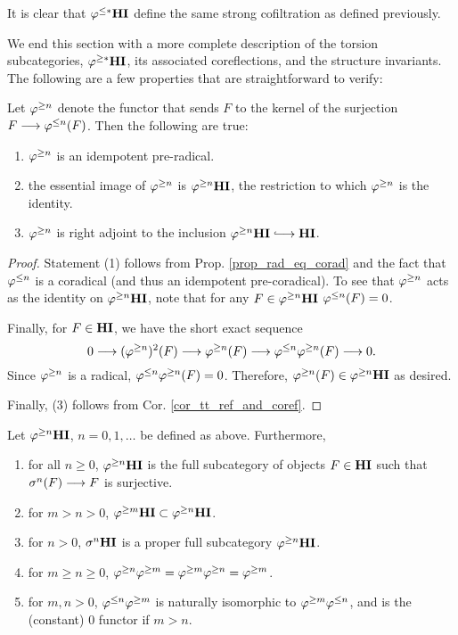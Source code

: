 It is clear that $\varphi^{\leq *}\mathbf{HI}$ define the same strong cofiltration as
defined previously. 

We end this section with a more complete description of the 
torsion subcategories, $\varphi^{\geq *}\mathbf{HI}$, its associated coreflections, and
the structure invariants. The following are a few properties that 
are straightforward to verify:

\begin{prop} 
Let $\varphi^{\geq n}$ denote the functor that sends $F$ to the kernel of
the surjection $F \longrightarrow \varphi^{\leq n}(F)$. Then the following are true:
\begin{enumerate}
\item $\varphi^{\geq n}$ is an idempotent pre-radical.
\tinyskip

\item the essential image of $\varphi^{\geq n}$ is $\varphi^{\geq n}\mathbf{HI}$, the 
restriction to which $\varphi^{\geq n}$ is the identity.
\tinyskip

\item $\varphi^{\geq n}$ is right adjoint to the inclusion $\THI{n} \into 
\HI$.
\tinyskip
\end{enumerate}
\end{prop}
\begin{proof}
Statement (1) follows from Prop. \ref{prop_rad_eq_corad} and
the fact that $\varphi^{\leq n}$ is a coradical (and thus an idempotent 
pre-coradical). To see that $\varphi^{\geq n}$ acts as the identity on 
$\varphi^{\geq n}\mathbf{HI}$, note that for any $F \in \varphi^{\geq n}\mathbf{HI}$ $\varphi^{\leq n}(F) = 0$. 

Finally, for $F \in \mathbf{HI}$, we have the short exact sequence
\[
0 \longrightarrow (\varphi^{\geq n})^2(F) \longrightarrow \varphi^{\geq n}(F) \longrightarrow \varphi^{\leq n} \varphi^{\geq n}(F) 
\longrightarrow 0.
\]
Since $\varphi^{\geq n}$ is a radical, $\varphi^{\leq n} \varphi^{\geq n}(F) = 0$. 
Therefore, $\varphi^{\geq n}(F) \in \varphi^{\geq n}\mathbf{HI}$ as desired.

Finally, (3) follows from Cor. \ref{cor_tt_ref_and_coref}.
\end{proof}

\begin{prop}\label{prop_THI_properties}
Let $\varphi^{\geq n}\mathbf{HI}$, $n = 0, 1,\dots$ be defined as above. Furthermore,

\begin{enumerate}
\item for all $n \geq 0$, $\varphi^{\geq n}\mathbf{HI}$ is the full subcategory of
objects $F \in \mathbf{HI}$ such that $\sigma^{n}(F) \longrightarrow F$ is surjective.
\tinyskip

\item for $m > n > 0$, $\varphi^{\geq m}\mathbf{HI} \subset \varphi^{\geq n}\mathbf{HI}$.
\tinyskip

\item for $n > 0$, $\sigma^{n} \mathbf{HI}$ is a proper full subcategory 
$\varphi^{\geq n}\mathbf{HI}$.
\tinyskip

\item for $m \geq n \geq 0$, $\varphi^{\geq n}\varphi^{\geq m} = \varphi^{\geq m}\varphi^{\geq n} =
\varphi^{\geq m}$.
\tinyskip

\item for $m, n > 0$, $\varphi^{\leq n}\varphi^{\geq m}$ is naturally isomorphic 
to $\varphi^{\geq m}\varphi^{\leq n}$, and is the (constant) $0$ functor if $m > n$.
\tinyskip

\end{enumerate}
\end{prop}

